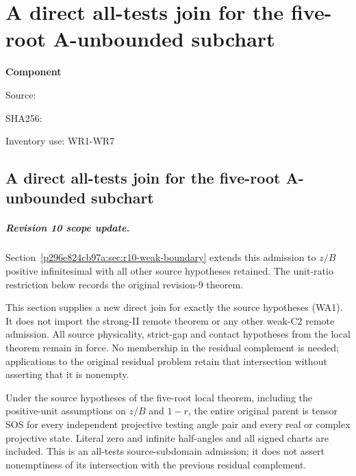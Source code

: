 \chapter{A direct all-tests join for the five-root A-unbounded subchart}
\label{component:p0d4eedd6c7a4}
\noindent\textbf{Component }\par
{\small\noindent Source: \par}
{\small\noindent SHA256: \par}
{\small\noindent Inventory use: WR1-WR7\par}
\medskip
\section{A direct all-tests join for the five-root A-unbounded subchart}
\label{p0d4eedd6c7a4:sec:r9-weak-A-remote}

\paragraph{Revision 10 scope update.}
Section~\ref{p296e824cb97a:sec:r10-weak-boundary} extends this admission to $z/B$
positive infinitesimal with all other source hypotheses retained.
The unit-ratio restriction below records the original revision-9 theorem.

This section supplies a new direct join for exactly the source
hypotheses (WA1). It does not import the strong-II remote theorem
or any other weak-C2 remote admission. All source physicality,
strict-gap and contact hypotheses from the local theorem remain
in force. No membership in the residual complement is needed;
applications to the original residual problem retain that intersection
without asserting that it is nonempty.

\begin{theorem}
Under the source hypotheses of the five-root local theorem, including
the positive-unit assumptions on $z/B$ and $1-r$, the entire original
parent is tensor SOS for every independent projective testing angle
pair and every real or complex projective state. Literal zero and
infinite half-angles and all signed charts are included.
This is an all-tests source-subdomain admission; it does not assert
nonemptiness of its intersection with the previous residual complement.
\end{theorem}

